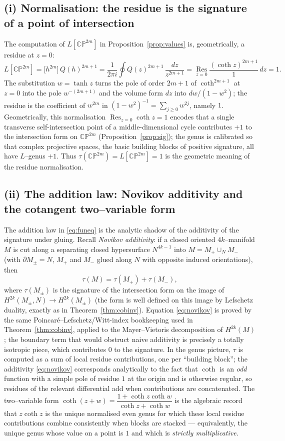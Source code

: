\documentclass[12pt]{article}
\theoremstyle{definition}
\begin{document}
\subsection*{(i) Normalisation: the residue is the signature of a point of intersection}

The computation of $L[\mathbb{CP}^{2m}]$ in Proposition~\ref{prop:values} is, geometrically,
a residue at $z=0$:
\[
L[\mathbb{CP}^{2m}]=\big[h^{2m}\big]\,Q(h)^{2m+1}
=\frac{1}{2\pi i}\oint Q(z)^{2m+1}\,\frac{dz}{z^{2m+1}}
=\operatorname*{Res}_{z=0}\frac{(\coth z)^{2m+1}}{1}\,dz=1 .
\]
The substitution $w=\tanh z$ turns the pole of order $2m+1$ of $\coth^{2m+1}$ at $z=0$
into the pole $w^{-(2m+1)}$ and the volume form $dz$ into $dw/(1-w^2)$; the residue is the
coefficient of $w^{2m}$ in $(1-w^2)^{-1}=\sum_{j\ge0}w^{2j}$, namely $1$.  Geometrically,
this normalisation $\operatorname{Res}_{z=0}\coth z=1$ encodes that a single transverse
self-intersection point of a middle-dimensional cycle contributes $+1$ to the
intersection form on $\mathbb{CP}^{2m}$ (Proposition~\ref{prop:sig}); the genus is
calibrated so that complex projective spaces, the basic building blocks of positive
signature, all have $L$--genus $+1$.  Thus $\tau(\mathbb{CP}^{2m})=L[\mathbb{CP}^{2m}]=1$
is the geometric meaning of the residue normalisation.

\subsection*{(ii) The addition law: Novikov additivity and the cotangent two--variable
form}

The addition law in \eqref{eq:funeq} is the analytic shadow of the additivity of the
signature under gluing.  Recall \emph{Novikov additivity}: if a closed oriented
$4k$--manifold $M$ is cut along a separating closed hypersurface
$N^{4k-1}$ into $M=M_+\cup_N M_-$ (with $\partial M_\pm=N$, $M_+$ and $M_-$ glued along
$N$ with opposite induced orientations), then
\[
\tau(M)=\tau(M_+)+\tau(M_-),
\tag{12}\label{eq:novikov}
\]
where $\tau(M_\pm)$ is the signature of the intersection form on the image of
$H^{2k}(M_\pm,N)\to H^{2k}(M_\pm)$ (the form is well defined on this image by
Lefschetz duality, exactly as in Theorem~\ref{thm:cobinv}).  Equation
\eqref{eq:novikov} is proved by the same Poincar\'e--Lefschetz/Witt-index bookkeeping used
in Theorem~\ref{thm:cobinv}, applied to the Mayer--Vietoris decomposition of
$H^{2k}(M)$; the boundary term that would obstruct naive additivity is precisely a
totally isotropic piece, which contributes $0$ to the signature.  In the genus picture,
$\tau$ is computed as a sum of local residue contributions, one per ``building block'';
the additivity \eqref{eq:novikov} corresponds analytically to the fact that $\coth$ is an
\emph{odd} function with a simple pole of residue $1$ at the origin and is otherwise
regular, so residues of the relevant differential add when contributions are concatenated.
The two--variable form $\coth(z+w)=\dfrac{1+\coth z\coth w}{\coth z+\coth w}$ is the
algebraic record that $z\coth z$ is the unique normalised even genus for which these
local residue contributions combine consistently when blocks are stacked --- equivalently,
the unique genus whose value on a point is $1$ and which is \emph{strictly multiplicative}.
\end{document}
